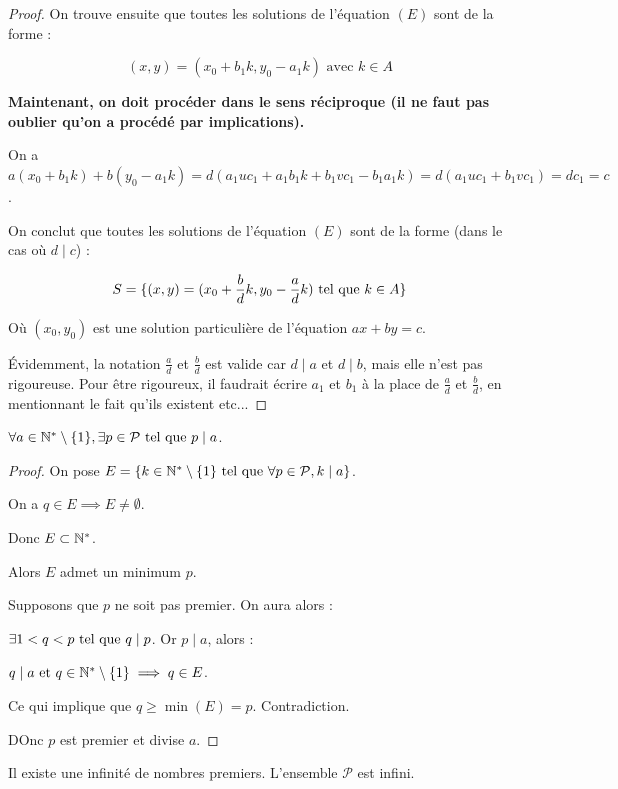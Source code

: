 \documentclass[12pt,a4paper]{report}
\begin{document}
\begin{proof}
    On trouve ensuite que toutes les solutions de l'équation $(E)$ sont de la forme :

    $$(x,y) = (x_0 + b_1 k, y_0 - a_1 k) \text{ avec } k \in A$$

    \textbf{Maintenant, on doit procéder dans le sens réciproque (il ne faut pas oublier qu'on a procédé par implications).}

    On a $a(x_0 + b_1 k) + b(y_0 - a_1 k) = d(a_1 u c_1 + a_1 b_1 k + b_1 v c_1 - b_1 a_1 k) = d(a_1 u c_1 + b_1 v c_1) = d c_1 = c$.

    On conclut que toutes les solutions de l'équation $(E)$ sont de la forme (dans le cas où $d \mid c$) :

    $$S = \{(x,y) = (x_0 + \frac{b}{d}k, y_0 - \frac{a}{d}k) \text{ tel que } k \in A\}$$

    Où $(x_0,y_0)$ est une solution particulière de l'équation $ax + by = c$.

    Évidemment, la notation $\frac{a}{d}$ et $\frac{b}{d}$ est valide car $d \mid a$ et $d \mid b$, mais elle n'est pas rigoureuse. Pour être rigoureux, il faudrait écrire $a_1$ et $b_1$ à la place de $\frac{a}{d}$ et $\frac{b}{d}$, en mentionnant le fait qu'ils existent etc...

\end{proof}

\begin{theorem}[Lemme]
    $\forall a \in \mathbb{N}^*\setminus\{1\}, \exists p \in \mathcal{P} \text{ tel que } p \mid a$.
\end{theorem}

\begin{proof}
On pose $E = \{k\in\mathbb{N}^* \setminus \{1\} \text{ tel que } \forall p \in \mathcal{P}, k \mid a\}$.

On a $q \in E \implies E \neq \emptyset$.

Donc $E \subset \mathbb{N}^*$.

Alors $E$ admet un minimum $p$.

Supposons que $p$ ne soit pas premier. On aura alors :

$\exists 1 < q < p \text{ tel que } q \mid p$. Or $p \mid a$, alors :

$q \mid a \text{ et } q \in \mathbb{N}^* \setminus \{1\} \implies q \in E$.

Ce qui implique que $q\ge \min(E) = p$. Contradiction.

DOnc $p$ est premier et divise $a$.

\end{proof}

\begin{property}
    Il existe une infinité de nombres premiers. L'ensemble $\mathcal{P}$ est infini.
\end{property}
\end{document}
